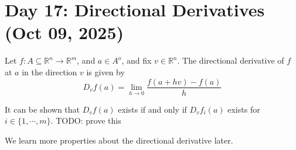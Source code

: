 \section{Day 17: Directional Derivatives (Oct 09, 2025)}

\begin{definition}
Let $f : A \subseteq \mathbb{R}^n \to \mathbb{R}^m$, and $a \in A^o$, and fix $v \in \mathbb{R}^n$. The directional derivative of $f$ at $a$ in the direction $v$ is given by
\[
    D_v f(a) = \lim_{ h \to 0 } \frac{f(a + hv) - f(a)}{h}
\]
\end{definition}

\noindent It can be shown that $D_vf(a)$ exists if and only if $D_vf_i(a)$ exists for $i \in \{ 1, \cdots, m \}$. TODO: prove this

We learn more properties about the directional derivative later.

